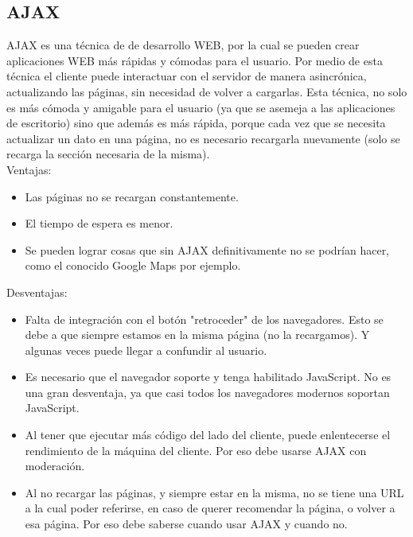 \documentclass[12pt]{book}
\begin{document}
\subsection{AJAX}
AJAX es una técnica de de desarrollo WEB, por la cual se pueden crear aplicaciones WEB más rápidas y cómodas para el usuario. Por medio de esta técnica el cliente puede interactuar con el servidor de manera asincrónica, actualizando las páginas, sin necesidad de volver a cargarlas. Esta técnica, no solo es más cómoda y amigable para el usuario (ya que se asemeja a las aplicaciones de escritorio) sino que además es más rápida, porque cada vez que se necesita actualizar un dato en una página, no es necesario recargarla nuevamente (solo se recarga la sección necesaria de la misma). \\
Ventajas:

\begin{itemize}
 	\item Las páginas no se recargan constantemente.
 	\item El tiempo de espera es menor.
 	\item Se pueden lograr cosas que sin AJAX definitivamente no se podrían hacer, como el conocido Google Maps por ejemplo.
 \end{itemize}

Desventajas:
\begin{itemize}
 	\item Falta de integración con el botón "retroceder" de los navegadores. Esto se debe a que siempre estamos en la misma página (no la recargamos). Y algunas veces puede llegar a confundir al usuario.
 	\item Es necesario que el navegador soporte y tenga habilitado JavaScript. No es una gran desventaja, ya que casi todos los navegadores modernos soportan JavaScript.
 	\item Al tener que ejecutar más código del lado del cliente, puede enlentecerse el rendimiento de la máquina del cliente. Por eso debe usarse AJAX con moderación.
 	\item Al no recargar las páginas, y siempre estar en la misma, no se tiene una URL a la cual poder referirse, en caso de querer recomendar la página, o volver a esa página. Por eso debe saberse cuando usar AJAX y cuando no.
 \end{itemize}
\end{document}
